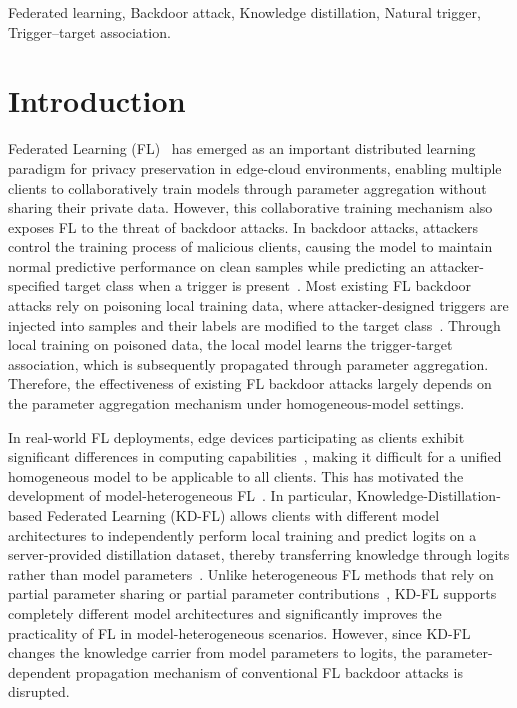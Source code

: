 \documentclass[lettersize,journal]{IEEEtran}
\begin{document}
\begin{IEEEkeywords}
Federated learning, Backdoor attack, Knowledge distillation, Natural trigger, Trigger–target association.
\end{IEEEkeywords}

\section{Introduction}

Federated Learning (FL)~\cite{FL1,FL2} has emerged as an important distributed learning paradigm for privacy preservation in edge-cloud environments, enabling multiple clients to collaboratively train models through parameter aggregation without sharing their private data.
However, this collaborative training mechanism also exposes FL to the threat of backdoor attacks.
In backdoor attacks, attackers control the training process of malicious clients, causing the model to maintain normal predictive performance on clean samples while predicting an attacker-specified target class when a trigger is present~\cite{Beyond,backdoor1}.
Most existing FL backdoor attacks rely on poisoning local training data, where attacker-designed triggers are injected into samples and their labels are modified to the target class~\cite{backdoor2}.
Through local training on poisoned data, the local model learns the trigger-target association, which is subsequently propagated through parameter aggregation.
Therefore, the effectiveness of existing FL backdoor attacks largely depends on the parameter aggregation mechanism under homogeneous-model settings.

In real-world FL deployments, edge devices participating as clients exhibit significant differences in computing capabilities~\cite{Computingpower1,Computingpower2}, making it difficult for a unified homogeneous model to be applicable to all clients.
This has motivated the development of model-heterogeneous FL~\cite{Heterogeneous1,Heterogeneous2}.
In particular, Knowledge-Distillation-based Federated Learning (KD-FL) allows clients with different model architectures to independently perform local training and predict logits on a server-provided distillation dataset, thereby transferring knowledge through logits rather than model parameters~\cite{Distillation_others1}.
Unlike heterogeneous FL methods that rely on partial parameter sharing or partial parameter contributions~\cite{PT-FL}, KD-FL supports completely different model architectures and significantly improves the practicality of FL in model-heterogeneous scenarios.
However, since KD-FL changes the knowledge carrier from model parameters to logits, the parameter-dependent propagation mechanism of conventional FL backdoor attacks is disrupted.
\end{document}
